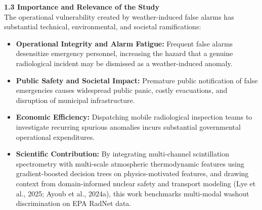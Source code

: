 \documentclass[11pt,a4paper]{article}
\begin{document}
\begin{framed}
\vspace{0.6em}
\noindent\textbf{1.3 Importance and Relevance of the Study}\\[0.3em]
The operational vulnerability created by weather-induced false alarms has substantial technical, environmental, and societal ramifications:
\begin{itemize}
    \item \textbf{Operational Integrity and Alarm Fatigue:} Frequent false alarms desensitize emergency personnel, increasing the hazard that a genuine radiological incident may be dismissed as a weather-induced anomaly.
    \item \textbf{Public Safety and Societal Impact:} Premature public notification of false emergencies causes widespread public panic, costly evacuations, and disruption of municipal infrastructure.
    \item \textbf{Economic Efficiency:} Dispatching mobile radiological inspection teams to investigate recurring spurious anomalies incurs substantial governmental operational expenditures.
    \item \textbf{Scientific Contribution:} By integrating multi-channel scintillation spectrometry with multi-scale atmospheric thermodynamic features using gradient-boosted decision trees on physics-motivated features, and drawing context from domain-informed nuclear safety and transport modeling (Lye et al., 2025; Ayoub et al., 2024a), this work benchmarks multi-modal washout discrimination on EPA RadNet data.
\end{itemize}


\end{framed}
\end{document}
